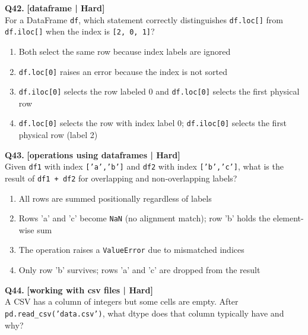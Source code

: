 \noindent\textbf{Q42.} \hfill {\small\color{LPUOrange}\textbf{[dataframe | Hard]}}\\[2pt]
For a DataFrame \texttt{df}, which statement correctly distinguishes \texttt{df.loc[]} from \texttt{df.iloc[]} when the index is \texttt{[2, 0, 1]}?

\begin{enumerate}[label=(\alph*),topsep=2pt,itemsep=1pt,partopsep=0pt,parsep=0pt]
    \item \relax Both select the same row because index labels are ignored
    \item \relax \texttt{df.loc[0]} raises an error because the index is not sorted
    \item \relax \texttt{df.iloc[0]} selects the row labeled 0 and \texttt{df.loc[0]} selects the first physical row
    \item \relax \texttt{df.loc[0]} selects the row with index label 0; \texttt{df.iloc[0]} selects the first physical row (label 2)
\end{enumerate}
\vspace{2mm}

\noindent\textbf{Q43.} \hfill {\small\color{LPUOrange}\textbf{[operations using dataframes | Hard]}}\\[2pt]
Given \texttt{df1} with index \texttt{['a','b']} and \texttt{df2} with index \texttt{['b','c']}, what is the result of \texttt{df1 + df2} for overlapping and non-overlapping labels?

\begin{enumerate}[label=(\alph*),topsep=2pt,itemsep=1pt,partopsep=0pt,parsep=0pt]
    \item \relax All rows are summed positionally regardless of labels
    \item \relax Rows 'a' and 'c' become \texttt{NaN} (no alignment match); row 'b' holds the element-wise sum
    \item \relax The operation raises a \texttt{ValueError} due to mismatched indices
    \item \relax Only row 'b' survives; rows 'a' and 'c' are dropped from the result
\end{enumerate}
\vspace{2mm}

\noindent\textbf{Q44.} \hfill {\small\color{LPUOrange}\textbf{[working with csv files | Hard]}}\\[2pt]
A CSV has a column of integers but some cells are empty. After \texttt{pd.read\_csv('data.csv')}, what dtype does that column typically have and why?

